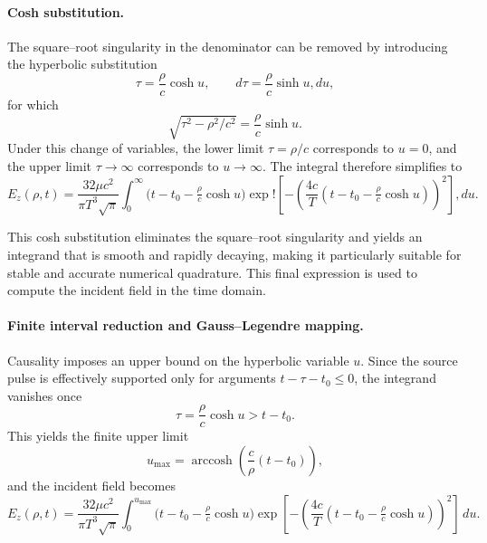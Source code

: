\documentclass{article}
\begin{document}
\paragraph{Cosh substitution.} The square--root singularity in the denominator can be removed by introducing the hyperbolic substitution \begin{equation} \tau = \frac{\rho}{c} \cosh u, \qquad d\tau = \frac{\rho}{c} \sinh u , du, \end{equation} for which \begin{equation} \sqrt{\tau^2 - \rho^2/c^2} = \frac{\rho}{c} \sinh u. \end{equation} Under this change of variables, the lower limit $\tau = \rho/c$ corresponds to $u=0$, and the upper limit $\tau \to \infty$ corresponds to $u \to \infty$. The integral therefore simplifies to \begin{equation} E_z(\rho,t) = \frac{32\mu c^2}{\pi T^3\sqrt{\pi}} \int_{0}^{\infty} \bigl(t - t_0 - \tfrac{\rho}{c}\cosh u\bigr) \exp!\left[-\left(\frac{4c}{T}\left(t - t_0 - \tfrac{\rho}{c}\cosh u\right)\right)^2\right] , du. \end{equation}

This cosh substitution eliminates the square--root singularity and yields an integrand that is smooth and rapidly decaying, making it particularly suitable for stable and accurate numerical quadrature. This final expression is used to compute the incident field in the time domain.

\paragraph{Finite interval reduction and Gauss--Legendre mapping.}
Causality imposes an upper bound on the hyperbolic variable $u$. Since the
source pulse is effectively supported only for arguments
$t-\tau-t_0 \le 0$, the integrand vanishes once
\begin{equation}
\tau = \frac{\rho}{c}\cosh u > t-t_0.
\end{equation}
This yields the finite upper limit
\begin{equation}
u_{\max}
= \operatorname{arccosh}\!\left(\frac{c}{\rho}(t-t_0)\right),
\end{equation}
and the incident field becomes
\begin{equation}
E_z(\rho,t)
= \frac{32\mu c^2}{\pi T^3\sqrt{\pi}}
\int_{0}^{u_{\max}}
\bigl(t-t_0-\tfrac{\rho}{c}\cosh u\bigr)
\exp\!\left[
-\left(
\frac{4c}{T}
\left(t-t_0-\tfrac{\rho}{c}\cosh u\right)
\right)^2
\right]
\,du.
\end{equation}
\end{document}

